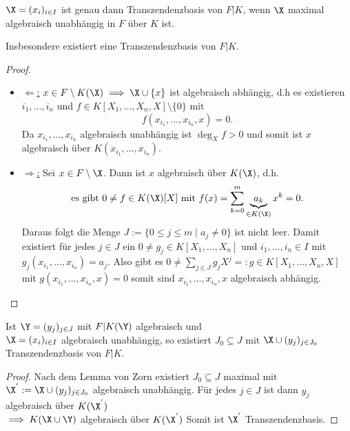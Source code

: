 \begin{satz}
    $\X = (x_i)_{i \in I}$ ist genau dann Transzendenzbasis von $F|K$,
    wenn $\X$ maximal algebraisch unabhängig in $F$ über $K$ ist.
    
    Insbesondere existiert eine Transzendenzbasis von $F|K$.
\end{satz}

\begin{proof}
    \begin{itemize}[label=]
        \item \underline{$\Leftarrow$:} $x \in F \setminus K(\X) \implies \X \cup \{x\}$ ist algebraisch abhängig, 
        d.h es existieren $i_1,\ldots,i_n$ und $f \in K[X_1,\ldots,X_n, X] \setminus \{0\}$ mit 
        $$ f(x_{i_1},\ldots,x_{i_n},x) = 0. $$
        Da $x_{i_1},\ldots,x_{i_n}$ algebraisch unabhängig ist $\deg_X f > 0$ 
        und somit ist $x$ algebraisch über $K(x_{i_1},\ldots,x_{i_n})$.
        
        \item \underline{$\Rightarrow$:} Sei $x \in F \setminus \X$. Dann ist $x$ algebraisch über $K(\X)$, d.h. 
        $$ \text{es gibt } 0 \neq f \in K(\X)[X] \text{ mit } f(x) = \sum_{k=0}^m \underbrace{a_k}_{\in K(\X)} x^k = 0. $$
        Daraus folgt die Menge $J := \{ 0 \leq j \leq m \mid a_j \ne 0\}$ ist nicht leer. 
        Damit existiert für jedes $j \in J$ ein $0 \neq g_j \in K[X_1, \ldots,X_n]$ und $i_1,\ldots,i_n \in I$ mit
        $g_j(x_{i_1},\ldots,x_{i_n}) = a_j$.  Also gibt es $0 \ne \sum\limits_{j \in J} g_j X^j =:g \in K[X_1, \ldots, X_n, X]$ mit 
        $g(x_{i_1},\ldots,x_{i_n},x) = 0$ somit sind $x_{i_1},\ldots,x_{i_n},x$ algebraisch abhängig.
    \end{itemize}
\end{proof}

\begin{lemma}[Austauschlemma]\label{lemma:exchange}
    Ist $\Y=(y_j)_{j \in J}$ mit $F|K(\Y)$ algebraisch und \\
    $\X = (x_i)_{i \in I}$ algebraisch unabhängig,
    so existiert $J_0 \subseteq J$ mit $\X \cup (y_j)_{j\in J_0}$ Transzendenzbasis von $F|K$.
\end{lemma}
\begin{proof}
    Nach dem Lemma von Zorn existiert $J_0 \subseteq J$ maximal mit 
    $\X^{'} := \X \cup (y_j)_{j \in J_0}$ algebraisch unabhängig.
    Für jedes $j \in J$ ist dann $y_j$ algebraisch über $K(\X^{'})$\\
    $\implies K(\X\cup \Y)$ algebraisch über $K(\X^{'})$
    Somit ist $\X^{'}$ Transzendenzbasis.
\end{proof}

